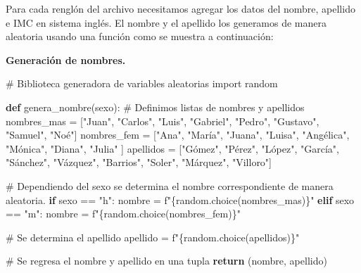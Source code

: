 \documentclass[
  spanish,
  letterpaper,
]{scrbook}
\newenvironment{Shaded}{\begin{snugshade}}{\end{snugshade}}
\newcommand{\CommentTok}[1]{\textcolor[rgb]{0.37,0.37,0.37}{#1}}
\newcommand{\ControlFlowTok}[1]{\textcolor[rgb]{0.00,0.23,0.31}{\textbf{#1}}}
\newcommand{\ImportTok}[1]{\textcolor[rgb]{0.00,0.46,0.62}{#1}}
\newcommand{\KeywordTok}[1]{\textcolor[rgb]{0.00,0.23,0.31}{\textbf{#1}}}
\newcommand{\NormalTok}[1]{\textcolor[rgb]{0.00,0.23,0.31}{#1}}
\newcommand{\OperatorTok}[1]{\textcolor[rgb]{0.37,0.37,0.37}{#1}}
\newcommand{\SpecialCharTok}[1]{\textcolor[rgb]{0.37,0.37,0.37}{#1}}
\newcommand{\SpecialStringTok}[1]{\textcolor[rgb]{0.13,0.47,0.30}{#1}}
\newcommand{\StringTok}[1]{\textcolor[rgb]{0.13,0.47,0.30}{#1}}
\theoremstyle{definition}
\theoremstyle{remark}
\begin{document}
Para cada renglón del archivo necesitamos agregar los datos del nombre,
apellido e IMC en sistema inglés. El nombre y el apellido los generamos
de manera aleatoria usando una función como se muestra a continuación:

\textbf{Generación de nombres.}

\begin{Shaded}
\begin{Highlighting}[]
\CommentTok{\# Biblioteca generadora de variables aleatorias}
\ImportTok{import}\NormalTok{ random}

\KeywordTok{def}\NormalTok{ genera\_nombre(sexo):}
    \CommentTok{\# Definimos listas de nombres y apellidos}
\NormalTok{    nombres\_mas }\OperatorTok{=}\NormalTok{  [}\StringTok{"Juan"}\NormalTok{, }\StringTok{"Carlos"}\NormalTok{, }\StringTok{"Luis"}\NormalTok{, }\StringTok{"Gabriel"}\NormalTok{, }
                    \StringTok{"Pedro"}\NormalTok{, }\StringTok{"Gustavo"}\NormalTok{, }\StringTok{"Samuel"}\NormalTok{, }\StringTok{"Noé"}\NormalTok{]}
\NormalTok{    nombres\_fem }\OperatorTok{=}\NormalTok{  [}\StringTok{"Ana"}\NormalTok{,  }\StringTok{"María"}\NormalTok{, }\StringTok{"Juana"}\NormalTok{, }\StringTok{"Luisa"}\NormalTok{, }
                    \StringTok{"Angélica"}\NormalTok{, }\StringTok{"Mónica"}\NormalTok{, }\StringTok{"Diana"}\NormalTok{, }\StringTok{"Julia"}\NormalTok{ ]}
\NormalTok{    apellidos }\OperatorTok{=}\NormalTok{ [}\StringTok{"Gómez"}\NormalTok{, }\StringTok{"Pérez"}\NormalTok{, }\StringTok{"López"}\NormalTok{, }\StringTok{"García"}\NormalTok{, }\StringTok{"Sánchez"}\NormalTok{, }
                 \StringTok{"Vázquez"}\NormalTok{, }\StringTok{"Barrios"}\NormalTok{, }\StringTok{"Soler"}\NormalTok{, }\StringTok{"Márquez"}\NormalTok{, }\StringTok{"Villoro"}\NormalTok{]}

    \CommentTok{\# Dependiendo del sexo se determina el nombre correspondiente de manera aleatoria.}
    \ControlFlowTok{if}\NormalTok{ sexo }\OperatorTok{==} \StringTok{"h"}\NormalTok{:}
\NormalTok{        nombre }\OperatorTok{=} \SpecialStringTok{f"}\SpecialCharTok{\{}\NormalTok{random}\SpecialCharTok{.}\NormalTok{choice(nombres\_mas)}\SpecialCharTok{\}}\SpecialStringTok{"} 
    \ControlFlowTok{elif}\NormalTok{ sexo }\OperatorTok{==} \StringTok{"m"}\NormalTok{:}
\NormalTok{        nombre }\OperatorTok{=} \SpecialStringTok{f"}\SpecialCharTok{\{}\NormalTok{random}\SpecialCharTok{.}\NormalTok{choice(nombres\_fem)}\SpecialCharTok{\}}\SpecialStringTok{"} 

    \CommentTok{\# Se determina el apellido}
\NormalTok{    apellido }\OperatorTok{=} \SpecialStringTok{f"}\SpecialCharTok{\{}\NormalTok{random}\SpecialCharTok{.}\NormalTok{choice(apellidos)}\SpecialCharTok{\}}\SpecialStringTok{"}

    \CommentTok{\# Se regresa el nombre y apellido en una tupla}
    \ControlFlowTok{return}\NormalTok{ (nombre, apellido)}
\end{Highlighting}
\end{Shaded}
\end{document}
